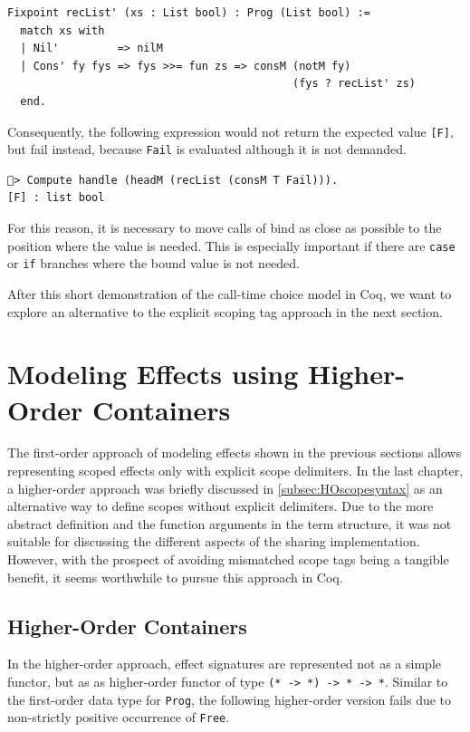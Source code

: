 \documentclass[a4paper, 11pt, fleqn, twoside, abstract=on]{scrreprt}
\newcommand{\hinl}[1]{\texttt{#1}}
\newcommand{\cinl}[1]{\texttt{#1}}
\begin{document}
\begin{verbatim}
Fixpoint recList' (xs : List bool) : Prog (List bool) :=
  match xs with
  | Nil'         => nilM
  | Cons' fy fys => fys >>= fun zs => consM (notM fy)
                                            (fys ? recList' zs)
  end.
\end{verbatim}

Consequently, the following expression would not return the expected value \cinl{[F]}, but fail instead, because \cinl{Fail} is evaluated although it is not demanded.

\begin{verbatim}
🐔> Compute handle (headM (recList (consM T Fail))).
[F] : list bool
\end{verbatim}

For this reason, it is necessary to move calls of bind as close as possible to the position where the value is needed.
This is especially important if there are \cinl{case} or \cinl{if} branches where the bound value is not needed.

After this short demonstration of the call-time choice model in Coq, we want to explore an alternative to the explicit scoping tag approach in the next section.

\section{Modeling Effects using Higher-Order Containers}
\label{sec:coqHO}

The first-order approach of modeling effects shown in the previous sections allows representing scoped effects only with explicit scope delimiters.
In the last chapter, a higher-order approach was briefly discussed in \autoref{subsec:HOscopesyntax} as an alternative way to define scopes without explicit delimiters.
Due to the more abstract definition and the function arguments in the term structure, it was not suitable for discussing the different aspects of the sharing implementation.
However, with the prospect of avoiding mismatched scope tags being a tangible benefit, it seems worthwhile to pursue this approach in Coq.

\subsection{Higher-Order Containers}
\label{subsec-higherOrderContainers}
In the higher-order approach, effect signatures are represented not as a simple functor, but as as higher-order functor of type \hinl{(* -> *) -> * -> *}.
Similar to the first-order data type for \hinl{Prog}, the following higher-order version fails due to non-strictly positive occurrence of \cinl{Free}.
\end{document}
